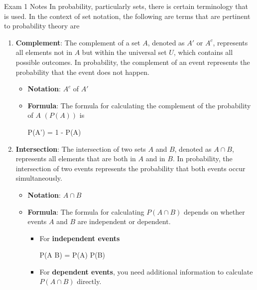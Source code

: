 \begin{examnotes}{Exam 1 Notes}
    In probability, particularly sets, there is certain terminology that is used. In the context of set notation, the following are terms that are pertinent to probability theory are

    \begin{enumerate}
        \item \textbf{Complement}: The complement of a set $A$, denoted as $A'$ or $A^{c}$, represents all elements not in $A$ but within the universal set $U$, which contains all possible outcomes. 
        In probability, the complement of an event represents the probability that the event does not happen.
        \begin{itemize}
            \item \textbf{Notation}: $A^{c}$ of $A'$
            \item \textbf{Formula}: The formula for calculating the complement of the probability of $A$ $(P(A))$ is
            \begin{center}
                \begin{highlightbox}
                    P(A') = 1 - P(A)
                \end{highlightbox}
            \end{center}
        \end{itemize}
        \item \textbf{Intersection}: The intersection of two sets $A$ and $B$, denoted as $A \cap B$, represents all elements that are both in $A$ and in $B$. In probability, the intersection of two
        events represents the probability that both events occur simultaneously.
        \begin{itemize}
            \item \textbf{Notation}: $A \cap B$
            \item \textbf{Formula}: The formula for calculating $P(A \cap B)$ depends on whether events $A$ and $B$ are independent or dependent.
            \begin{itemize}
                \item For \textbf{independent events}
                \begin{center}
                    \begin{highlightbox}
                        P(A \cap B) = P(A) \cdot P(B)
                    \end{highlightbox}
                \end{center}
                \item For \textbf{dependent events}, you need additional information to calculate $P(A \cap B)$ directly.

\end{itemize}
\end{itemize}
\end{enumerate}
\end{examnotes}
